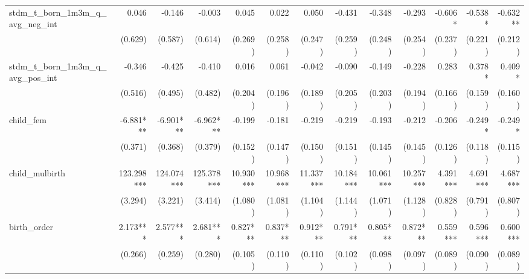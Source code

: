 \begin{tabular}{lrrrrrrrrrrrr}
stdm\_t\_born\_1m3m\_q\_avg\_neg\_int       &        0.046 &       -0.146 &       -0.003 &        0.045 &        0.022 &        0.050 &       -0.431 &       -0.348 &       -0.293 &      -0.606* &      -0.538* &     -0.632** \\ 
                                            &      (0.629) &      (0.587) &      (0.614) &      (0.269) &      (0.258) &      (0.247) &      (0.259) &      (0.248) &      (0.254) &      (0.237) &      (0.221) &      (0.212) \\ 
stdm\_t\_born\_1m3m\_q\_avg\_pos\_int       &       -0.346 &       -0.425 &       -0.410 &        0.016 &        0.061 &       -0.042 &       -0.090 &       -0.149 &       -0.228 &        0.283 &       0.378* &       0.409* \\ 
                                            &      (0.516) &      (0.495) &      (0.482) &      (0.204) &      (0.196) &      (0.189) &      (0.205) &      (0.203) &      (0.194) &      (0.166) &      (0.159) &      (0.160) \\ 
child\_fem                                  &    -6.881*** &    -6.901*** &    -6.962*** &       -0.199 &       -0.181 &       -0.219 &       -0.219 &       -0.193 &       -0.212 &       -0.206 &      -0.249* &      -0.249* \\ 
                                            &      (0.371) &      (0.368) &      (0.379) &      (0.152) &      (0.147) &      (0.150) &      (0.151) &      (0.145) &      (0.145) &      (0.126) &      (0.118) &      (0.115) \\ 
child\_mulbirth                             &   123.298*** &   124.074*** &   125.378*** &    10.930*** &    10.968*** &    11.337*** &    10.184*** &    10.061*** &    10.257*** &     4.391*** &     4.691*** &     4.687*** \\ 
                                            &      (3.294) &      (3.221) &      (3.414) &      (1.080) &      (1.081) &      (1.104) &      (1.144) &      (1.071) &      (1.128) &      (0.828) &      (0.791) &      (0.807) \\ 
birth\_order                                &     2.173*** &     2.577*** &     2.681*** &     0.827*** &     0.837*** &     0.912*** &     0.791*** &     0.805*** &     0.872*** &     0.559*** &     0.596*** &     0.600*** \\ 
                                            &      (0.266) &      (0.259) &      (0.280) &      (0.105) &      (0.110) &      (0.110) &      (0.102) &      (0.098) &      (0.097) &      (0.089) &      (0.090) &      (0.089) \\ 

\end{tabular}
